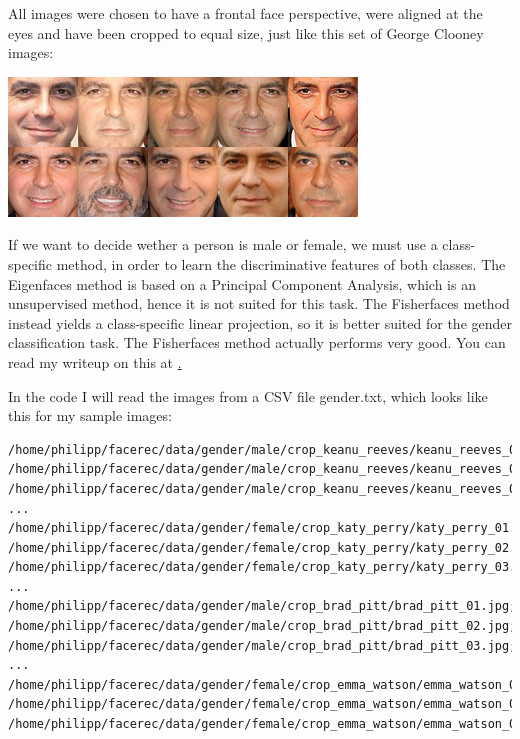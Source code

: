 All images were chosen to have a frontal face perspective, were aligned at the eyes and have been cropped to equal size, just like this set of George Clooney images:

\begin{center}
	\includegraphics[scale=0.60]{img/libfacerec/gender_classification/clooney.png}
\end{center}

If we want to decide wether a person is male or female, we must use a class-specific method, in order to learn the discriminative features of both classes. The Eigenfaces method is based on a Principal Component Analysis, which is an unsupervised method, hence it is not suited for this task. The Fisherfaces method instead yields a class-specific linear projection, so it is better suited for the gender classification task. The Fisherfaces method actually performs very good. You can read my writeup on this at \href{http://www.bytefish.de/blog/gender_classification}.

In the code I will read the images from a CSV file gender.txt, which looks like this for my sample images:

\begin{lstlisting}
/home/philipp/facerec/data/gender/male/crop_keanu_reeves/keanu_reeves_01.jpg;0
/home/philipp/facerec/data/gender/male/crop_keanu_reeves/keanu_reeves_02.jpg;0
/home/philipp/facerec/data/gender/male/crop_keanu_reeves/keanu_reeves_03.jpg;0
...
/home/philipp/facerec/data/gender/female/crop_katy_perry/katy_perry_01.jpg;1
/home/philipp/facerec/data/gender/female/crop_katy_perry/katy_perry_02.jpg;1
/home/philipp/facerec/data/gender/female/crop_katy_perry/katy_perry_03.jpg;1
...
/home/philipp/facerec/data/gender/male/crop_brad_pitt/brad_pitt_01.jpg;0
/home/philipp/facerec/data/gender/male/crop_brad_pitt/brad_pitt_02.jpg;0
/home/philipp/facerec/data/gender/male/crop_brad_pitt/brad_pitt_03.jpg;0
...
/home/philipp/facerec/data/gender/female/crop_emma_watson/emma_watson_08.jpg;1
/home/philipp/facerec/data/gender/female/crop_emma_watson/emma_watson_02.jpg;1
/home/philipp/facerec/data/gender/female/crop_emma_watson/emma_watson_03.jpg;1
\end{lstlisting}

